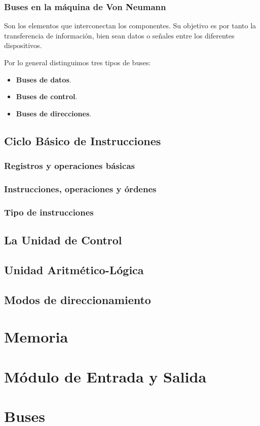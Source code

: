 \documentclass[a4paper, 11pt, titlepage]{article}
\begin{document}
        \subsubsection{Buses en la máquina de Von Neumann}

            Son los elementos que interconectan los componentes. Su objetivo es por tanto la transferencia 
            de información, bien sean datos o señales entre los diferentes dispositivos.

            Por lo general distinguimos tres tipos de buses:

            \begin{itemize}
                \item \textbf{Buses de datos}.
                \item \textbf{Buses de control}.
                \item \textbf{Buses de direcciones}.
            \end{itemize}

    \subsection{Ciclo Básico de Instrucciones}

        \subsubsection{Registros y operaciones básicas}

        \subsubsection{Instrucciones, operaciones y órdenes}

        \subsubsection{Tipo de instrucciones}

    \subsection{La Unidad de Control}\label{unidadcontrol}

    \subsection{Unidad Aritmético-Lógica}

    \subsection{Modos de direccionamiento}

\section{Memoria}\label{memoria}
\section{Módulo de Entrada y Salida}\label{entradasalida}
\section{Buses}
\end{document}
